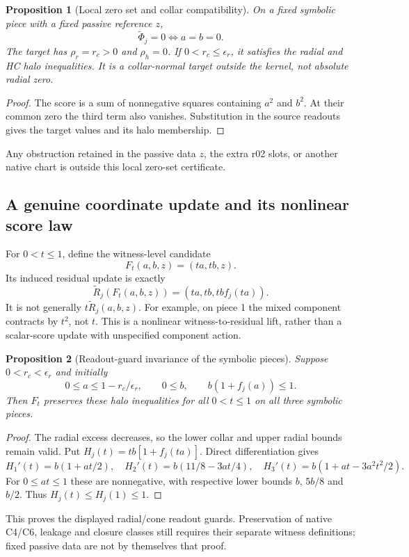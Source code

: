 \documentclass[11pt,a4paper]{article}
\newtheorem{proposition}{Proposition}
\begin{document}
\begin{proposition}[Local zero set and collar compatibility]
On a fixed symbolic piece with a fixed passive reference $z$,
\[
\widetilde\Phi_j=0
\Longleftrightarrow a=b=0.
\]
The target has $\rho_r=r_c>0$ and $\rho_h=0$. If
$0<r_c\le\epsilon_r$, it satisfies the radial and HC halo inequalities.
It is a collar-normal target outside the kernel, not absolute radial zero.
\end{proposition}
\begin{proof}
The score is a sum of nonnegative squares containing $a^2$ and $b^2$.
At their common zero the third term also vanishes. Substitution in the
source readouts gives the target values and its halo membership.
\end{proof}
Any obstruction retained in the passive data $z$, the extra r02 slots,
or another native chart is outside this local zero-set certificate.

\subsection{A genuine coordinate update and its nonlinear score law}
For $0<t\le1$, define the witness-level candidate
\[
F_t(a,b,z)=(ta,tb,z).
\]
Its induced residual update is exactly
\[
\widetilde R_j(F_t(a,b,z))
=(ta,tb,tb f_j(ta)).
\]
It is not generally $t\widetilde R_j(a,b,z)$. For example, on piece 1
the mixed component contracts by $t^2$, not $t$.
This is a nonlinear witness-to-residual lift, rather than a scalar-score
update with unspecified component action.

\begin{proposition}[Readout-guard invariance of the symbolic pieces]
Suppose $0<r_c<\epsilon_r$ and initially
\[
0\le a\le1-r_c/\epsilon_r,\qquad
0\le b,\qquad b(1+f_j(a))\le1.
\]
Then $F_t$ preserves these halo inequalities for all $0<t\le1$ on all
three symbolic pieces.
\end{proposition}
\begin{proof}
The radial excess decreases, so the lower collar and upper radial bounds
remain valid. Put $H_j(t)=tb[1+f_j(ta)]$. Direct differentiation gives
\[
H_1'(t)=b(1+at/2),\quad
H_2'(t)=b(11/8-3at/4),\quad
H_3'(t)=b(1+at-3a^2t^2/2).
\]
For $0\le at\le1$ these are nonnegative, with respective lower bounds
$b$, $5b/8$ and $b/2$. Thus $H_j(t)\le H_j(1)\le1$.
\end{proof}
This proves the displayed radial/cone readout guards. Preservation of native
C4/C6, leakage and closure classes still requires their separate witness
definitions; fixed passive data are not by themselves that proof.
\end{document}
